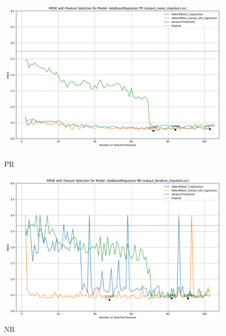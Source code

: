\begin{figure}[H]
    \centering
    \begin{minipage}{0.45\textwidth}
        \centering
        \includegraphics[width=\linewidth]{reg_section_all/images_reg_featred_graphs/feature_selection_PR.png}
        \caption{PR}
        \label{fig:pr_reg_featred}
    \end{minipage}\hfill
    \begin{minipage}{0.45\textwidth}
        \centering
        \includegraphics[width=\linewidth]{reg_section_all/images_reg_featred_graphs/feature_selection_NR.png}
        \caption{NR}
        \label{fig:nr_reg_featred}
    \end{minipage}
\end{figure}

